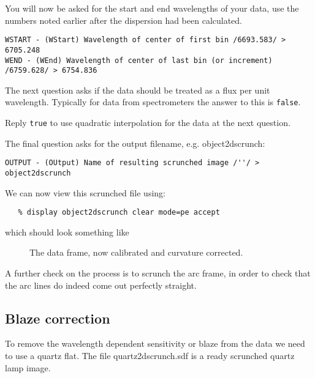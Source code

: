 You will now be asked for the start and end wavelengths of your data, use the numbers noted earlier after the dispersion had been calculated.
{\scspec{\small}{ }
\begin{verbatim}
WSTART - (WStart) Wavelength of center of first bin /6693.583/ > 6705.248
WEND - (WEnd) Wavelength of center of last bin (or increment) /6759.628/ > 6754.836
\end{verbatim}

The next question asks if the data should be treated as a flux per unit wavelength. Typically for data from spectrometers the answer to this is {\tt false}.

Reply {\tt true} to use quadratic interpolation for the data at the next question.

The final question asks for the output filename, e.g. object2dscrunch:
{\scspec{\small}{ }
\begin{verbatim}
OUTPUT - (OUtput) Name of resulting scrunched image /''/ > object2dscrunch
\end{verbatim}

We can now view this scrunched file using:

{\scspec{\small}{ }
\begin{verbatim}
   % display object2dscrunch clear mode=pe accept
\end{verbatim}
}

which should look something like 

\begin{figure}
\begin{center}
{\leavevmode\epsfysize=136mm}

\parbox{140mm}{
\caption{The data frame, now calibrated and curvature corrected.}
\label{scrunched}
}
\end{center}
\end{figure}


A further check on the process is to scrunch the arc frame, in order to check that the arc lines do indeed come out perfectly straight.


\subsection{Blaze correction}

To remove the wavelength dependent sensitivity or blaze from the data we need to use a quartz flat. The file quartz2dscrunch.sdf is a ready scrunched quartz lamp image.

}}
